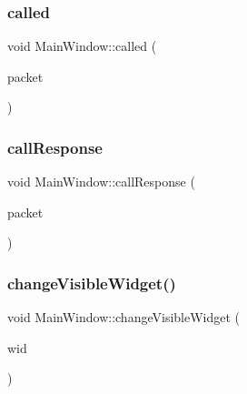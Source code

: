 \subsubsection{\texorpdfstring{called}{called}}
{\footnotesize\ttfamily void Main\+Window\+::called (\begin{DoxyParamCaption}\item[{I\+Packet \&}]{packet }\end{DoxyParamCaption})\hspace{0.3cm}{\ttfamily [slot]}}

\mbox{\label{classMainWindow_a2b5ea73e534de8287c7eadfb24db5acd}} 
\subsubsection{\texorpdfstring{call\+Response}{callResponse}}
{\footnotesize\ttfamily void Main\+Window\+::call\+Response (\begin{DoxyParamCaption}\item[{I\+Packet \&}]{packet }\end{DoxyParamCaption})\hspace{0.3cm}{\ttfamily [slot]}}

\mbox{\label{classMainWindow_a3cb8372306825d0b28040bd7c9f4d6bc}} 
\subsubsection{\texorpdfstring{change\+Visible\+Widget()}{changeVisibleWidget()}}
{\footnotesize\ttfamily void Main\+Window\+::change\+Visible\+Widget (\begin{DoxyParamCaption}\item[{\mbox{\hyperlink{classMainWindow_a44e53650a12325d1ad0625dbf1ef7d98}{Widget}}}]{wid }\end{DoxyParamCaption})}

\mbox{\label{classMainWindow_aa2b3f69a6185302ac2ad76fef6acb528}} 
